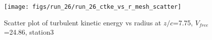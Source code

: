\begin{figure}[H]
\centering
\texttt{[image: figs/run\_26/run\_26\_ctke\_vs\_r\_mesh\_scatter]}
\caption{Scatter plot of turbulent kinetic energy vs radius at $z/c$=7.75, $V_{free}$=24.86, station3}
\label{fig:run_26_ctke_vs_r_mesh_scatter}
\end{figure}


